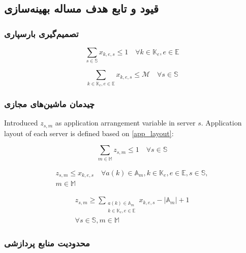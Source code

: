 \subsection{قیود و تابع هدف مساله بهینه‌سازی}

\subsubsection{تصمیم‌گیری بارسپاری}

\begin{equation} \label{task_assignment}
    \sum_{s \in \mathbb{S}} x_{k,e,s} \leq 1 \quad \forall k \in \mathbb{K}_e, e \in \mathbb{E}
\end{equation}

\begin{equation} \label{cont_num}
    \sum_{k \in \mathbb{K}_e, e \in \mathbb{E}} x_{k,e,s} \leq \mathcal{M} \quad \forall s \in \mathbb{S}
\end{equation}

\subsubsection{چیدمان ماشین‌های مجازی}
Introduced $z_{s,m}$ as application arrangement variable in server $s$. Application layout of each server is defined based on \ref{app_layout}:

\begin{equation} \label{app_layout}
    \sum_{m \in \mathbb{M}} z_{s,m} \leq 1 \quad \forall s \in \mathbb{S}
\end{equation}

\begin{multline} \label{zx_match}
    z_{s,m} \leq x_{k,e,s} \quad \forall a(k) \in \mathbb{A}_m, k \in \mathbb{K}_e, e \in \mathbb{E}, s \in \mathbb{S}, \\ m \in \mathbb{M}
\end{multline}

\begin{multline} \label{zx_match2}
    z_{s,m} \geq \sum_{\substack{a(k) \in \mathbb{A}_m\\ k \in \mathbb{K}_e, e \in \mathbb{E}}}x_{k,e,s} - |\mathbb{A}_m| + 1 \\ \forall s \in \mathbb{S}, m \in \mathbb{M}
\end{multline}

\subsubsection{محدودیت منابع پردازشی}

